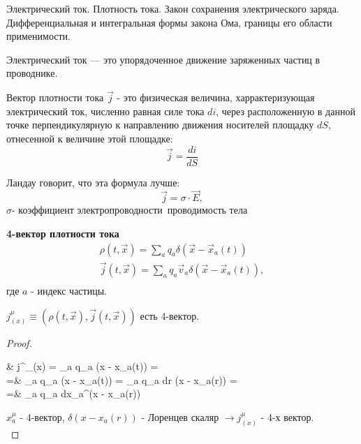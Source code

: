 \documentclass[__main__.tex]{subfiles}
\begin{document}
Электрический ток. Плотность тока. Закон сохранения электрического заряда. Дифференциальная и интегральная формы закона Ома, границы его области применимости.\\ 

\begin{definition}
	Электрический ток — это упорядоченное движение заряженных частиц в проводнике. 
\end{definition}

\begin{definition}
	Вектор плотности тока $\vec{j}$ - это физическая величина, харрактеризующая электрический ток, численно равная силе тока $di$, через расположенную в данной точке перпендикулярную к направлению движения носителей площадку $dS$, отнесенной к величине этой площадке:
	$$\vec{j}=\frac{di}{dS}$$
\end{definition}
Ландау говорит, что эта формула лучше:
$$
\vec{j}=σ\cdot\vec{E},
$$
$σ$- коэффициент электропроводности\ проводимость тела

\textbf{4-вектор плотности тока}\\
\begin{gather*}
\rho(t, \vec x) = \sum_a q_a \delta(\vec x - \vec x_a(t))\\
\vec j(t, \vec x) = \sum_a q_a \vec v_a \delta(\vec x - \vec x_a(t)),\\
\end{gather*}
где $a$ - индекс частицы.
\begin{statement}
	$j^\mu_{(x)}\equiv \left(\rho(t, \vec x), \vec j(t, \vec x) \right)$ есть 4-вектор.
\end{statement}
\begin{proof}
	\begin{flalign}
	\begin{split}
	&
	j^\mu_{(x)}
	=
	\sum_a q_a  \delta(\vec x - \vec x_a(t))
	=\\
	=&
	\sum_a q_a  \delta(\vec x - \vec x_a(t))
	=
	\sum_a q_a \int dr \delta(\vec x - \vec x_a(r))
	=\\
	=&
	\sum_a q_a \int dx_a^\mu \delta(x - x_a(r))
	\end{split}
	\end{flalign}
	$x^\mu_a$ - 4-вектор, $\delta(x - x_a(r))$ - Лоренцев скаляр $\rightarrow j^\mu_{(x)}$ - 4-х вектор.\\
\end{proof}
\end{document}
